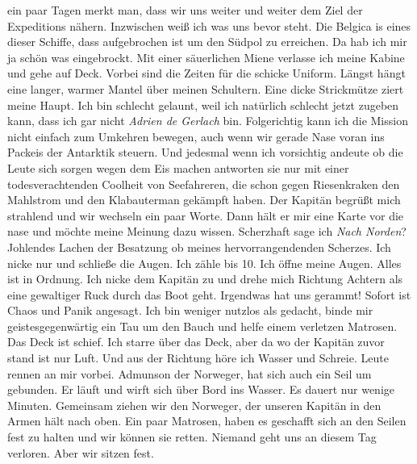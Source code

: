 \documentclass{article}
\begin{document}
ein paar Tagen merkt man, dass wir uns weiter und weiter dem Ziel der Expeditions nähern. Inzwischen weiß ich
was uns bevor steht. Die Belgica is eines dieser Schiffe, dass aufgebrochen ist um den Südpol zu erreichen. Da
hab ich mir ja schön was eingebrockt. Mit einer säuerlichen Miene verlasse ich meine Kabine und gehe auf Deck.
Vorbei sind die Zeiten für die schicke Uniform. Längst hängt eine langer, warmer Mantel über meinen Schultern.
Eine dicke
Strickmütze ziert meine Haupt. Ich bin schlecht gelaunt, weil ich natürlich schlecht jetzt zugeben kann, dass
ich gar nicht \textit{Adrien de Gerlach} bin. Folgerichtig kann ich die Mission nicht einfach zum Umkehren
bewegen, auch wenn wir gerade Nase voran ins Packeis der Antarktik steuern. Und jedesmal wenn ich vorsichtig
andeute ob die Leute sich sorgen wegen dem Eis machen antworten sie nur mit einer todesverachtenden Coolheit von
Seefahreren, die schon gegen Riesenkraken den Mahlstrom und den Klabauterman gekämpft haben. Der Kapitän begrüßt
mich strahlend und wir wechseln ein paar Worte. Dann hält er mir eine Karte vor die nase und möchte meine
Meinung dazu wissen. Scherzhaft sage ich \textit{Nach Norden}? Johlendes Lachen der Besatzung ob meines
hervorrangendenden Scherzes. Ich nicke nur und schließe die Augen. Ich zähle bis 10. Ich öffne meine Augen.
Alles ist in Ordnung. Ich nicke dem Kapitän zu und drehe mich Richtung Achtern als eine gewaltiger Ruck durch
das Boot geht. Irgendwas hat uns gerammt! Sofort ist Chaos und Panik angesagt. Ich bin weniger nutzlos als
gedacht, binde mir geistesgegenwärtig ein Tau um den Bauch und helfe einem verletzen Matrosen. Das Deck ist
schief. Ich starre über das Deck, aber da wo der Kapitän zuvor stand ist nur Luft. Und aus der Richtung höre ich
Wasser und Schreie. Leute rennen an mir vorbei. Admunson der Norweger, hat sich auch ein Seil um gebunden. Er
läuft und wirft sich über Bord ins Wasser. Es dauert nur wenige Minuten. Gemeinsam ziehen wir den Norweger, der
unseren Kapitän in den Armen hält nach oben. Ein paar Matrosen, haben es geschafft sich an den Seilen fest zu
halten und wir können sie retten. Niemand geht uns an diesem Tag verloren. Aber wir sitzen fest.
\\
\end{document}
